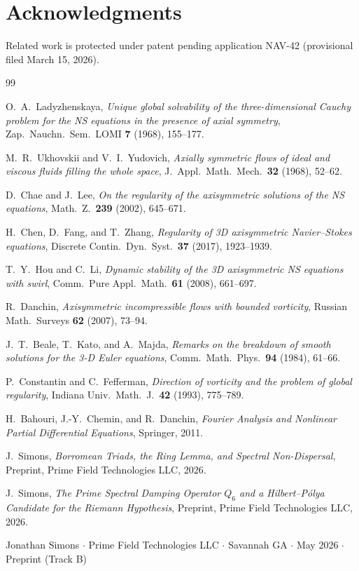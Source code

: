 \documentclass[11pt]{article}
\begin{document}
\section*{Acknowledgments}
Related work is protected under patent pending application NAV-42
(provisional filed March 15, 2026).

\begin{thebibliography}{99}

O.~A.~Ladyzhenskaya,
\textit{Unique global solvability of the three-dimensional Cauchy problem
for the NS equations in the presence of axial symmetry},
Zap.\ Nauchn.\ Sem.\ LOMI \textbf{7} (1968), 155--177.

M.~R.~Ukhovskii and V.~I.~Yudovich,
\textit{Axially symmetric flows of ideal and viscous fluids filling the
whole space}, J.\ Appl.\ Math.\ Mech.\ \textbf{32} (1968), 52--62.

D.~Chae and J.~Lee,
\textit{On the regularity of the axisymmetric solutions of the NS equations},
Math.\ Z.\ \textbf{239} (2002), 645--671.

H.~Chen, D.~Fang, and T.~Zhang,
\textit{Regularity of 3D axisymmetric Navier--Stokes equations},
Discrete Contin.\ Dyn.\ Syst.\ \textbf{37} (2017), 1923--1939.

T.~Y.~Hou and C.~Li,
\textit{Dynamic stability of the 3D axisymmetric NS equations with swirl},
Comm.\ Pure Appl.\ Math.\ \textbf{61} (2008), 661--697.

R.~Danchin,
\textit{Axisymmetric incompressible flows with bounded vorticity},
Russian Math.\ Surveys \textbf{62} (2007), 73--94.

J.~T.~Beale, T.~Kato, and A.~Majda,
\textit{Remarks on the breakdown of smooth solutions for the 3-D Euler equations},
Comm.\ Math.\ Phys.\ \textbf{94} (1984), 61--66.

P.~Constantin and C.~Fefferman,
\textit{Direction of vorticity and the problem of global regularity},
Indiana Univ.\ Math.\ J.\ \textbf{42} (1993), 775--789.

H.~Bahouri, J.-Y.~Chemin, and R.~Danchin,
\textit{Fourier Analysis and Nonlinear Partial Differential Equations},
Springer, 2011.

J.~Simons,
\textit{Borromean Triads, the Ring Lemma, and Spectral Non-Dispersal},
Preprint, Prime Field Technologies LLC, 2026.

J.~Simons,
\textit{The Prime Spectral Damping Operator $Q_6$ and a Hilbert--P\'olya
Candidate for the Riemann Hypothesis},
Preprint, Prime Field Technologies LLC, 2026.

\end{thebibliography}

\vfill
\begin{center}
{\small Jonathan Simons $\cdot$ Prime Field Technologies LLC $\cdot$ Savannah GA
$\cdot$ May 2026 $\cdot$ Preprint (Track B)}
\end{center}
\end{document}
